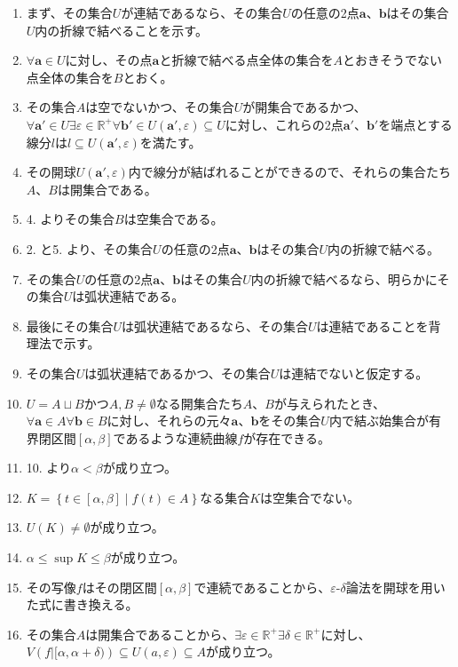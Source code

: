 \documentclass[dvipdfmx]{jsarticle}
\begin{document}
\begin{enumerate}
\item
  まず、その集合$U$が連結であるなら、その集合$U$の任意の2点$\mathbf{a}$、$\mathbf{b}$はその集合$U$内の折線で結べることを示す。
\item
  $\forall\mathbf{a} \in U$に対し、その点$\mathbf{a}$と折線で結べる点全体の集合を$A$とおきそうでない点全体の集合を$B$とおく。
\item
  その集合$A$は空でないかつ、その集合$U$が開集合であるかつ、$\forall\mathbf{a}' \in U\exists\varepsilon \in \mathbb{R}^{+}\forall\mathbf{b}' \in U\left( \mathbf{a}',\varepsilon \right) \subseteq U$に対し、これらの2点$\mathbf{a}'$、$\mathbf{b}'$を端点とする線分$l$は$l \subseteq U\left( \mathbf{a}',\varepsilon \right)$を満たす。
\item
  その開球$U\left( \mathbf{a}',\varepsilon \right)$内で線分が結ばれることができるので、それらの集合たち$A、B$は開集合である。
\item
  4. よりその集合$B$は空集合である。
\item
  2. と5. より、その集合$U$の任意の2点$\mathbf{a}$、$\mathbf{b}$はその集合$U$内の折線で結べる。
\item
  その集合$U$の任意の2点$\mathbf{a}$、$\mathbf{b}$はその集合$U$内の折線で結べるなら、明らかにその集合$U$は弧状連結である。
\item
  最後にその集合$U$は弧状連結であるなら、その集合$U$は連結であることを背理法で示す。
\item
  その集合$U$は弧状連結であるかつ、その集合$U$は連結でないと仮定する。
\item
  $U = A \sqcup B$かつ$A,B \neq \emptyset$なる開集合たち$A$、$B$が与えられたとき、$\forall\mathbf{a} \in A\forall\mathbf{b} \in B$に対し、それらの元々$\mathbf{a}$、$\mathbf{b}$をその集合$U$内で結ぶ始集合が有界閉区間$[\alpha,\beta]$であるような連続曲線$f$が存在できる。
\item
  10. より$\alpha < \beta$が成り立つ。
\item
  $K = \left\{ t \in [\alpha,\beta] \middle| f(t) \in A \right\}$なる集合$K$は空集合でない。
\item
  $U(K) \neq \emptyset$が成り立つ。
\item
  $\alpha \leq \sup K \leq \beta$が成り立つ。
\item
  その写像$f$はその閉区間$[\alpha,\beta]$で連続であることから、$\varepsilon$-$\delta$論法を開球を用いた式に書き換える。
\item
  その集合$A$は開集合であることから、$\exists\varepsilon \in \mathbb{R}^{+}\exists\delta \in \mathbb{R}^{+}$に対し、$V\left( f|[\alpha,\alpha + \delta) \right) \subseteq U(a,\varepsilon) \subseteq A$が成り立つ。

\end{enumerate}
\end{document}
